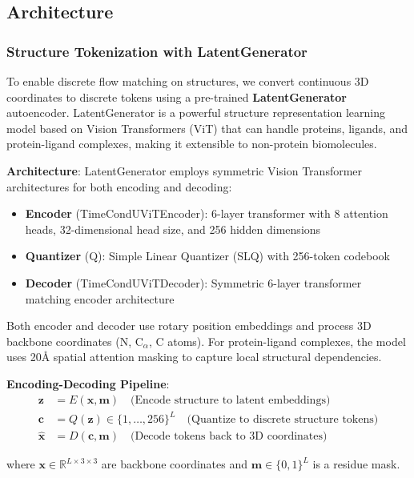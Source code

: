 \documentclass[11pt,a4paper]{article}
\newcommand{\real}{\mathbb{R}}
\begin{document}
\subsection{Architecture}

\subsubsection{Structure Tokenization with LatentGenerator}

To enable discrete flow matching on structures, we convert continuous 3D coordinates to discrete tokens using a pre-trained \textbf{LatentGenerator} autoencoder. LatentGenerator is a powerful structure representation learning model based on Vision Transformers (ViT) that can handle proteins, ligands, and protein-ligand complexes, making it extensible to non-protein biomolecules.

\textbf{Architecture}: LatentGenerator employs symmetric Vision Transformer architectures for both encoding and decoding:

\begin{itemize}
\item \textbf{Encoder} (TimeCondUViTEncoder): 6-layer transformer with 8 attention heads, 32-dimensional head size, and 256 hidden dimensions
\item \textbf{Quantizer} (Q): Simple Linear Quantizer (SLQ) with 256-token codebook 
\item \textbf{Decoder} (TimeCondUViTDecoder): Symmetric 6-layer transformer matching encoder architecture
\end{itemize}

Both encoder and decoder use rotary position embeddings and process 3D backbone coordinates (N, C$_\alpha$, C atoms). For protein-ligand complexes, the model uses 20Å spatial attention masking to capture local structural dependencies.

\textbf{Encoding-Decoding Pipeline}:
\begin{align}
\mathbf{z} &= E(\mathbf{x}, \mathbf{m}) \quad \text{(Encode structure to latent embeddings)} \\
\mathbf{c} &= Q(\mathbf{z}) \in \{1,\ldots,256\}^L \quad \text{(Quantize to discrete structure tokens)} \\
\hat{\mathbf{x}} &= D(\mathbf{c}, \mathbf{m}) \quad \text{(Decode tokens back to 3D coordinates)}
\end{align}

where $\mathbf{x} \in \real^{L \times 3 \times 3}$ are backbone coordinates and $\mathbf{m} \in \{0,1\}^L$ is a residue mask.
\end{document}
